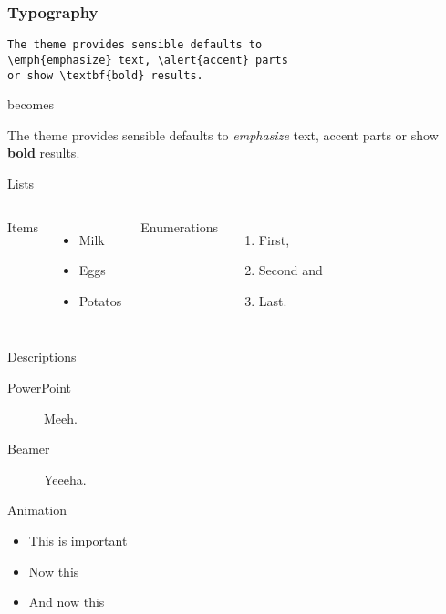 \documentclass[10pt, compress]{beamer}
\begin{document}
\begin{frame}[fragile]
  \frametitle{Typography}
      \begin{verbatim}The theme provides sensible defaults to
\emph{emphasize} text, \alert{accent} parts
or show \textbf{bold} results.\end{verbatim}

  \begin{center}becomes\end{center}

  The theme provides sensible defaults to \emph{emphasize} text,
  \alert{accent} parts or show \textbf{bold} results.
\end{frame}
\begin{frame}{Lists}
  \begin{columns}[onlytextwidth]
      Items
      \begin{itemize}
        \item Milk \item Eggs \item Potatos
      \end{itemize}

      Enumerations
      \begin{enumerate}
        \item First, \item Second and \item Last.
      \end{enumerate}
  \end{columns}
\end{frame}
\begin{frame}{Descriptions}
  \begin{description}
    \item[PowerPoint] Meeh.
    \item[Beamer] Yeeeha.
  \end{description}
\end{frame}
\begin{frame}{Animation}
  \begin{itemize}[<+- | alert@+>]
    \item \alert<4>{This is important}
    \item Now this
    \item And now this
  \end{itemize}
\end{frame}
\end{document}
